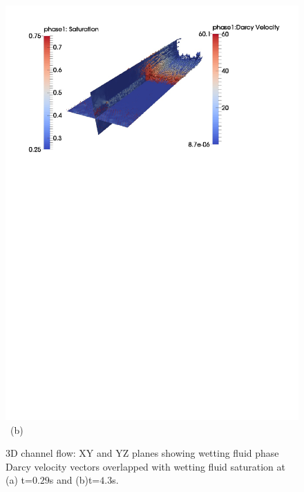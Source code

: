 \begin{figure}[ht]
{{\includegraphics[width=1.0\textwidth]{./Pics1/3D_Channel/3D_channel_darcy_vel_planes_30_1_1.pdf}
}
\vspace{-12.0cm}
\hbox{\hspace{6.0cm} (b)      
}
}     
\caption{3D channel flow: XY and YZ planes showing wetting fluid phase Darcy velocity vectors overlapped with wetting fluid saturation at (a) t=$0.29$s and (b)t=$4.3$s.}
\label{fig:3DChannel_planes}
\end{figure}
\clearpage



